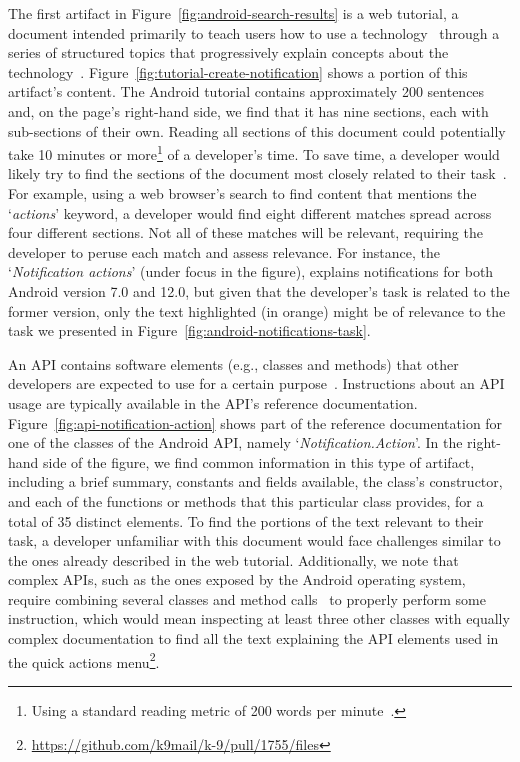 The first artifact in Figure~\ref{fig:android-search-results}
is a 
 web tutorial, a document intended primarily to teach users how to use 
a technology~\cite{arya2020} through a series of structured topics 
that progressively explain concepts about the technology~\cite{Jiang2016b, Jiang2017}. 
Figure~\ref{fig:tutorial-create-notification} 
shows a portion of this artifact's content. 
The Android tutorial contains  approximately 200 sentences
and, on the page's right-hand side, we find that 
it
has nine sections, each with sub-sections of their own. 
Reading all sections of this document could potentially 
take 10 minutes or more\footnote{Using a standard reading metric of 200 words per minute~\cite{Just1980}.} of a developer's time.
To save time, a developer would likely try to find the sections of the document
most closely related to their task~\cite{Li2013}.
For example, using a web browser's search to find content that mentions the `\textit{actions}' keyword, 
a developer would find eight different matches spread across four different sections.
Not all of these matches will be relevant, requiring the developer to peruse each
match and assess relevance. 
For instance, the `\textit{Notification actions}'
 (under focus in the figure), 
explains 
notifications for both Android version 7.0 and 12.0, 
 but given that the developer's task is related to the former version,
only the text highlighted (in orange)
might be of relevance to the task we presented in Figure~\ref{fig:android-notifications-task}.






An \acs{API} 
contains software elements (e.g., classes and methods) that other developers 
are   expected to use for a certain purpose~\cite{monperrus2012}. Instructions about an API usage are typically available in the API's reference documentation.
Figure~\ref{fig:api-notification-action} shows part of the reference documentation for one of the classes of the Android API, namely `\textit{Notification.Action}'. 
In the right-hand side of the figure, we find common 
information in this type of artifact, including a brief summary,
constants and fields available, the class's constructor, and 
each of the functions or methods that this particular class provides,  
for a total of 35 distinct elements.
To find the portions of the text relevant to
their task,
a developer unfamiliar with this document would 
face challenges similar to the ones already  described in the web tutorial. Additionally, 
we note that complex APIs, 
such as the ones exposed by the Android operating system, require combining several classes
and method calls~\cite{robillard2011field} to properly perform some instruction,
which would mean inspecting at least three other classes 
with equally complex documentation
to find all the text explaining the API elements used in the quick actions menu\footnote{\url{https://github.com/k9mail/k-9/pull/1755/files}}.





